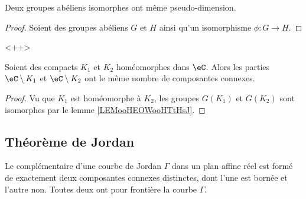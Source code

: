 \begin{lemma}		\label{LEMooEYDNooEUKUpn}
	Deux groupes abéliens isomorphes ont même pseudo-dimension.
\end{lemma}

\begin{proof}
	Soient des groupes abéliens \( G\) et \( H\) ainsi qu'un isomorphisme \(\phi \colon G\to H  \).
\end{proof}<++>

\begin{corollary}		\label{CORooQNUIooKLtWVD}
	Soient des compacts \( K_1\) et \( K_2\) homéomorphes dans \( \eC\). Alors les parties \( \eC\setminus K_1\) et \( \eC\setminus K_2\) ont le même nombre de composantes connexes.
\end{corollary}

\begin{proof}
	Vu que \( K_1\) est homéomorphe à \( K_2\), les groupes \( G(K_1)\) et \( G(K_2)\) sont isomorphes par le lemme \ref{LEMooHEOWooHTtHsJ}.
\end{proof}

\subsection{Théorème de Jordan}

\begin{theorem}\label{ThoHSPWBuh}
	Le complémentaire d'une courbe de Jordan \( \Gamma\) dans un plan affine réel est formé de exactement deux composantes connexes distinctes, dont l'une est bornée et l'autre non. Toutes deux ont pour frontière la courbe \( \Gamma\).
\end{theorem}
